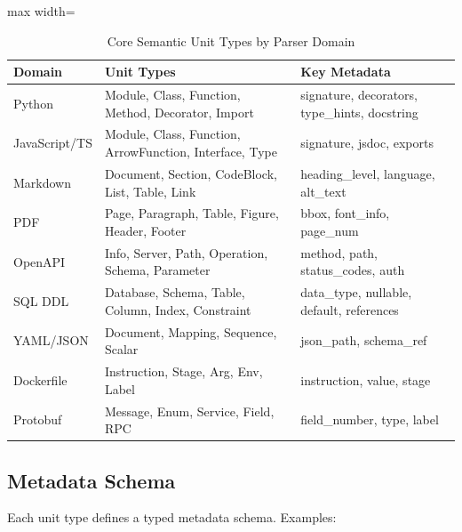 \begin{table}[htbp]
\centering
\caption{Core Semantic Unit Types by Parser Domain}
\label{tab:parsing:unit-types}
\begin{adjustbox}{max width=\textwidth}
\begin{tabular}{lll}
\toprule
\textbf{Domain} & \textbf{Unit Types} & \textbf{Key Metadata} \\
\midrule
Python & Module, Class, Function, Method, Decorator, Import & signature, decorators, type\_hints, docstring \\
JavaScript/TS & Module, Class, Function, ArrowFunction, Interface, Type & signature, jsdoc, exports \\
Markdown & Document, Section, CodeBlock, List, Table, Link & heading\_level, language, alt\_text \\
PDF & Page, Paragraph, Table, Figure, Header, Footer & bbox, font\_info, page\_num \\
OpenAPI & Info, Server, Path, Operation, Schema, Parameter & method, path, status\_codes, auth \\
SQL DDL & Database, Schema, Table, Column, Index, Constraint & data\_type, nullable, default, references \\
YAML/JSON & Document, Mapping, Sequence, Scalar & json\_path, schema\_ref \\
Dockerfile & Instruction, Stage, Arg, Env, Label & instruction, value, stage \\
Protobuf & Message, Enum, Service, Field, RPC & field\_number, type, label \\
\bottomrule
\end{tabular}
\end{adjustbox}
\end{table}

\subsection{Metadata Schema}
\label{sec:parsing:metadata}

Each unit type defines a typed metadata schema. Examples:

